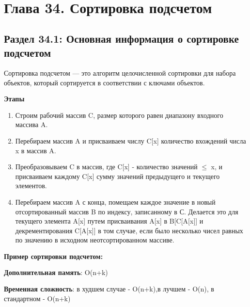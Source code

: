 
\chapter*{Глава 34. Сортировка подсчетом}
\section*{Раздел 34.1: Основная информация о сортировке подсчетом} 

\vspace{\baselineskip}
Сортировка подсчетом — это алгоритм целочисленной сортировки для набора
объектов, который сортируется в соответствии с ключами объектов.

\vspace{\baselineskip}
\textbf{Этапы}

\vspace{\baselineskip}

\begin{enumerate}
\item Строим рабочий массив C, размер которого равен диапазону входного массива A.
\item Перебираем массив A и присваиваем числу C[x] количество вхождений числа x в массив A.
\item Преобразовываем C в массив, где C[x] - количество значений $\leq$ x, и присваиваем каждому C[x] сумму значений предыдущего и текущего элементов.
\item Перебираем массив A с конца, помещаем каждое значение в новый отсортированный массив B по индексу, записанному в С. Делается это для текущего элемента A[x] путем присваивания A[x] в B[C[A[x]] и декрементирования C[A[x]] в том случае, если было несколько чисел равных по значению в исходном неотсортированном массиве.
\end{enumerate}

\vspace{\baselineskip}
\textbf{Пример сортировки подсчетом:}

\vspace{\baselineskip}

\vspace{\baselineskip}
\textbf{Дополнительная память}: O(n+k)

\vspace{\baselineskip}
\textbf{Временная сложность}: в худшем случае - O(n+k),в лучшем - O(n), в стандартном - O(n+k)

\vspace{\baselineskip}
